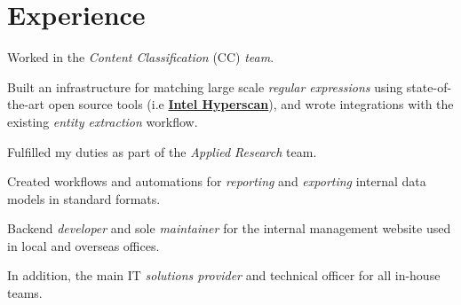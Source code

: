 \documentclass[]{openfont}
\begin{document}
\begin{minipage}[t]{0.65\textwidth}


    \section{Experience}
    \vspace{\topsep}
    \begin{tightemize}
        \item Worked in the \textit{Content Classification} (CC) \textit{team}.
        \item Built an infrastructure for matching large scale \textit{regular expressions} using state-of-the-art open source tools (i.e \href{https://www.intel.com/content/www/us/en/developer/articles/technical/introduction-to-hyperscan.html}{\textbf{Intel Hyperscan}}), and wrote integrations with the existing \textit{entity extraction} workflow.
    \end{tightemize}
    \sectionsep

    \begin{tightemize}
        \item Fulfilled my duties as part of the \textit{Applied Research} team.
        \item Created workflows and automations for \textit{reporting} and \textit{exporting} internal data models in standard formats.
    \end{tightemize}
    \sectionsep

    \begin{tightemize}
        \item Backend \textit{developer} and sole \textit{maintainer} for the internal management website used in local and overseas offices.
        \item In addition, the main IT \textit{solutions provider} and technical officer for all in-house teams.
    \end{tightemize}
    \sectionsep


\end{minipage}
\end{document}
